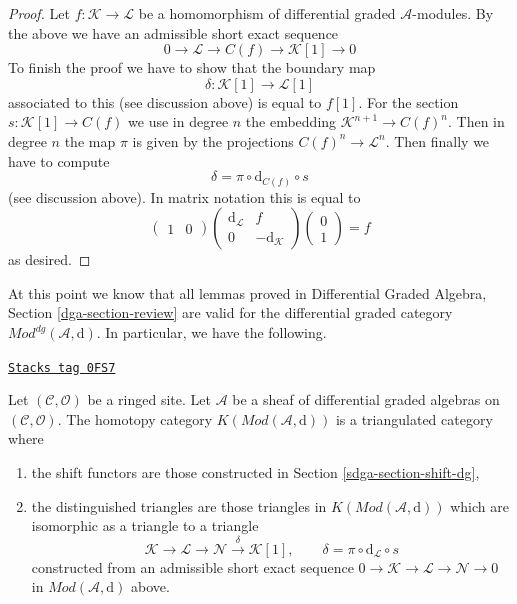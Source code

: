 \begin{proof}
Let $f : \mathcal{K} \to \mathcal{L}$
be a homomorphism of differential graded $\mathcal{A}$-modules.
By the above we have an admissible short exact sequence
$$
0 \to \mathcal{L} \to C(f) \to \mathcal{K}[1] \to 0
$$
To finish the proof we have to show that the boundary map
$$
\delta : \mathcal{K}[1] \to \mathcal{L}[1]
$$
associated to this (see discussion above) is equal to $f[1]$.
For the section $s : \mathcal{K}[1] \to C(f)$ we use in degree
$n$ the embedding $\mathcal{K}^{n + 1} \to C(f)^n$. Then
in degree $n$ the map $\pi$ is given by the projections
$C(f)^n \to \mathcal{L}^n$. Then finally we have to compute
$$
\delta = \pi \circ \text{d}_{C(f)} \circ s
$$
(see discussion above). In matrix notation this is equal to
$$
\left(
\begin{matrix}
1 & 0
\end{matrix}
\right)
\left(
\begin{matrix}
\text{d}_\mathcal{L} & f \\
0 & -\text{d}_\mathcal{K}
\end{matrix}
\right)
\left(
\begin{matrix}
0 \\
1
\end{matrix}
\right) = f
$$
as desired.
\end{proof}

At this point we know that all lemmas proved in
Differential Graded Algebra, Section \ref{dga-section-review}
are valid for the differential graded category
$\textit{Mod}^{dg}(\mathcal{A}, \text{d})$.
In particular, we have the following.

\begin{proposition}
\label{sdga-proposition-homotopy-category-triangulated}
\href{https://stacks.math.columbia.edu/tag/0FS7}{\texttt{Stacks tag 0FS7}}

Let $(\mathcal{C}, \mathcal{O})$ be a ringed site.
Let $\mathcal{A}$ be a sheaf of differential graded algebras
on $(\mathcal{C}, \mathcal{O})$.
The homotopy category $K(\textit{Mod}(\mathcal{A}, \text{d}))$
is a triangulated category where
\begin{enumerate}
\item the shift functors are those constructed in
Section \ref{sdga-section-shift-dg},
\item the distinguished triangles are those triangles
in $K(\textit{Mod}(\mathcal{A}, \text{d}))$ which are
isomorphic as a triangle to a triangle
$$
\mathcal{K} \to \mathcal{L} \to \mathcal{N}
\xrightarrow{\delta} \mathcal{K}[1],\quad\quad
\delta = \pi \circ \text{d}_\mathcal{L} \circ s
$$
constructed from an admissible short exact sequence
$0 \to \mathcal{K} \to \mathcal{L} \to \mathcal{N} \to 0$
in $\textit{Mod}(\mathcal{A}, \text{d})$ above.
\end{enumerate}
\end{proposition}


